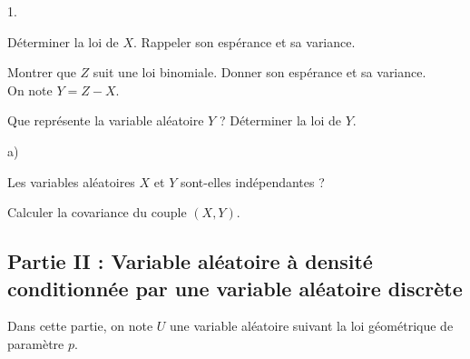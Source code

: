 \documentclass[11pt]{article}%
\begin{document}
\begin{noliste}{1.}
 \setlength{\itemsep}{4mm}
\item Déterminer la loi de $X$. Rappeler son espérance et sa variance.

\item Montrer que $Z$ suit une loi binomiale. Donner son espérance et
sa variance.\\
On note $Y = Z-X$.

\item Que représente la variable aléatoire $Y$ ? Déterminer la loi
de $Y$.

\item
\begin{noliste}{a)}
 \setlength{\itemsep}{2mm}
\item Les variables aléatoires $X$ et $Y$ sont-elles indépendantes ?

\item Calculer la covariance du couple $\left( X,Y\right) $.
\end{noliste}
\end{noliste}

\subsection*{Partie II : Variable aléatoire à densité
conditionnée par une variable aléatoire discrète}

\noindent
Dans cette partie, on note $U$ une variable aléatoire suivant la loi
géométrique de paramètre $p.$
\end{document}
